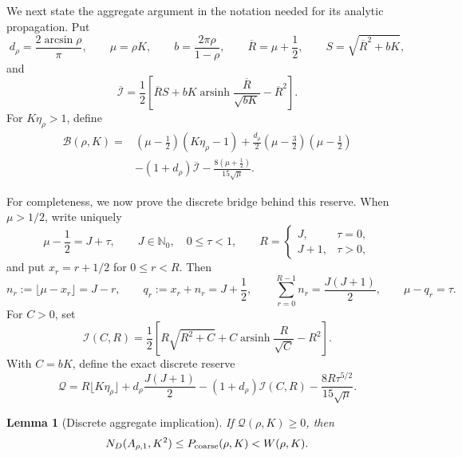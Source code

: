 \documentclass[11pt]{article}
\numberwithin{equation}{section}
\newtheorem{lemma}[theorem]{Lemma}
\theoremstyle{definition}
\theoremstyle{remark}
\begin{document}
We next state the aggregate argument in the notation needed for its
analytic propagation.  Put
\[
 d_\rho=\frac{2\arcsin\rho}{\pi},\qquad
 \mu=\rho K,\qquad
 b=\frac{2\pi\rho}{1-\rho},\qquad
 \overline R=\mu+\frac12,\qquad
 S=\sqrt{\overline R^2+bK},
\]
and
\[
 \overline{\mathcal I}
 =\frac12\left[
 \overline RS+bK\operatorname{arsinh}
 \frac{\overline R}{\sqrt{bK}}-\overline R^2\right].
\]
For \(K\eta_\rho>1\), define
\begin{equation}
\begin{aligned}
 \mathcal B(\rho,K)={}&
 (\mu-\tfrac12)(K\eta_\rho-1)
 +\frac{d_\rho}{2}(\mu-\tfrac32)(\mu-\tfrac12)\\
 &-(1+d_\rho)\overline{\mathcal I}
 -\frac{8(\mu+\tfrac12)}{15\sqrt\mu}.
\end{aligned}
\label{cm:eq-B-def}
\end{equation}

For completeness, we now prove the discrete bridge behind this reserve.
When \(\mu>1/2\), write uniquely
\[
 \mu-\frac12=J+\tau,\qquad
 J\in\mathbb N_0,\quad0\leq\tau<1,
 \qquad
 R=\begin{cases}J,&\tau=0,\\J+1,&\tau>0,\end{cases}
\]
and put \(x_r=r+1/2\) for \(0\leq r<R\).  Then
\begin{equation}
 n_r:=\lfloor\mu-x_r\rfloor=J-r,\qquad
 q_r:=x_r+n_r=J+\frac12,\qquad
 \sum_{r=0}^{R-1}n_r=\frac{J(J+1)}2,\qquad
 \mu-q_r=\tau.
 \label{cm:eq-aggregate-arithmetic}
\end{equation}
For \(C>0\), set
\begin{equation}
 \mathcal I(C,R)=\frac12\left[
 R\sqrt{R^2+C}+C\operatorname{arsinh}\frac R{\sqrt C}-R^2
 \right].
 \label{cm:eq-I-def}
\end{equation}
With \(C=bK\), define the exact discrete reserve
\begin{equation}
 \mathcal Q=
 R\lfloor K\eta_\rho\rfloor
 +d_\rho\frac{J(J+1)}2
 -(1+d_\rho)\mathcal I(C,R)
 -\frac{8R\tau^{5/2}}{15\sqrt\mu}.
 \label{cm:eq-Q-def}
\end{equation}

\begin{lemma}[Discrete aggregate implication]
\label{cm:lem-Q-implication}
If \(\mathcal Q(\rho,K)\geq0\), then
\begin{equation}
 N_D(A_{\rho,1},K^2)
 \leq P_{\rm coarse}(\rho,K)<W(\rho,K).
 \label{cm:eq-Q-implication}
\end{equation}
\end{lemma}
\end{document}
